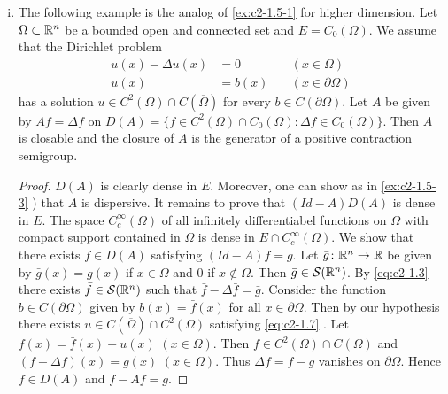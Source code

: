 \begin{examples}
\begin{enumerate}[(i), wide, labelsep=1em, itemindent=\parindent]
\item \label{ex:c2-1.5-5}
The following example is the analog of  \ref{ex:c2-1.5-1}   for higher dimension.
Let $\Omega \subset \mathbb{R}^n$ be a bounded open and connected set and $E = C_{0}(\Omega)$.
We assume that the Dirichlet problem
\begin{equation} \label{eq:c2-1.7}
\begin{array}{lll}
u(x) - \Delta u(x) &= 0 \quad &(x \in \Omega)\\
u(x) &= b(x) \quad &(x \in \partial\Omega)
\end{array}
\end{equation}
has a solution $u \in C^{2}(\Omega) \cap C(\overline{\Omega})$ for every $b \in C(\partial\Omega)$.
Let $A$ be given by $Af = \Delta f$ on
$D(A) = \{f \in C^{2}(\Omega) \cap C_{0}(\Omega) \colon \Delta f \in C_{0}(\Omega)\}$.
Then $A$ is closable and the closure of $A$ is the generator of a positive contraction semigroup.

\begin{proof}
$D(A)$ is clearly dense in $E$.
Moreover, one can show as in \ref{ex:c2-1.5-3} ) that $A$ is dispersive.
It remains to prove that $(Id - A)D(A)$ is dense in $E$.
The space $C_{c}^{\infty}(\Omega)$ of all infinitely differentiabel functions on $\Omega$ with compact support contained in $\Omega$ is dense in $E \cap C_{c}^{\infty}(\Omega)$.
We show that there exists $f \in D(A)$ satisfying $(Id - A)f = g$.
Let $\bar{g} \colon \mathbb{R}^{n} \to \mathbb{R}$ be given by $\bar{g}(x) = g(x)$ if $x \in \Omega$ and $0$ if $x \not\in \Omega$.
Then $\bar{g} \in \mathcal{S}(\mathbb{R}^n)$.
By  \eqref{eq:c2-1.3}  there exists $\bar{f} \in \mathcal{S}(\mathbb{R}^n)$ such that $\bar{f} - \Delta\bar{f} = \bar{g}$.
Consider the function $b \in C(\partial\Omega)$ given by $b(x) = \bar{f}(x)$ for all $x \in \partial\Omega$.
Then by our hypothesis there exists $u \in C(\overline{\Omega}) \cap C^{2}(\Omega)$ satisfying  \eqref{eq:c2-1.7}  .
Let $f(x) = \bar{f}(x) - u(x)$ $(x \in \Omega)$.
Then $f \in C^{2}(\Omega) \cap C(\Omega)$ and $(f - \Delta f)(x) = g(x)$ $(x \in \Omega)$.
Thus $\Delta f = f - g$ vanishes on $\partial\Omega$.
Hence $f \in D(A)$ and $f - Af = g$.
\end{proof}


\end{enumerate}
\end{examples}
